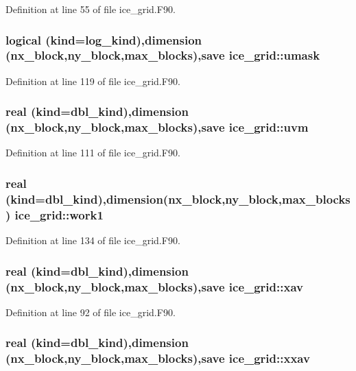 Definition at line 55 of file ice\_\-grid.F90.\hypertarget{namespaceice__grid_a02f5ae5edcea6185af4949d9be61cc26}{
\subsubsection[{umask}]{\setlength{\rightskip}{0pt plus 5cm}logical (kind=log\_\-kind),dimension (nx\_\-block,ny\_\-block,max\_\-blocks),save {\bf ice\_\-grid::umask}}}
\label{namespaceice__grid_a02f5ae5edcea6185af4949d9be61cc26}


Definition at line 119 of file ice\_\-grid.F90.\hypertarget{namespaceice__grid_aa8b13eb710c7be4a90e210294e37b5af}{
\subsubsection[{uvm}]{\setlength{\rightskip}{0pt plus 5cm}real (kind=dbl\_\-kind),dimension (nx\_\-block,ny\_\-block,max\_\-blocks),save {\bf ice\_\-grid::uvm}}}
\label{namespaceice__grid_aa8b13eb710c7be4a90e210294e37b5af}


Definition at line 111 of file ice\_\-grid.F90.\hypertarget{namespaceice__grid_a77ce4807a6b38d81367a3a7d67e2aa7c}{
\subsubsection[{work1}]{\setlength{\rightskip}{0pt plus 5cm}real (kind=dbl\_\-kind),dimension(nx\_\-block,ny\_\-block,max\_\-blocks) {\bf ice\_\-grid::work1}}}
\label{namespaceice__grid_a77ce4807a6b38d81367a3a7d67e2aa7c}


Definition at line 134 of file ice\_\-grid.F90.\hypertarget{namespaceice__grid_aa84e4b92963d682ab3222a9d5716cbe8}{
\subsubsection[{xav}]{\setlength{\rightskip}{0pt plus 5cm}real (kind=dbl\_\-kind),dimension (nx\_\-block,ny\_\-block,max\_\-blocks),save {\bf ice\_\-grid::xav}}}
\label{namespaceice__grid_aa84e4b92963d682ab3222a9d5716cbe8}


Definition at line 92 of file ice\_\-grid.F90.\hypertarget{namespaceice__grid_a7c8bb3b029d335971804fce931af7a4b}{
\subsubsection[{xxav}]{\setlength{\rightskip}{0pt plus 5cm}real (kind=dbl\_\-kind),dimension (nx\_\-block,ny\_\-block,max\_\-blocks),save {\bf ice\_\-grid::xxav}}}
\label{namespaceice__grid_a7c8bb3b029d335971804fce931af7a4b}


